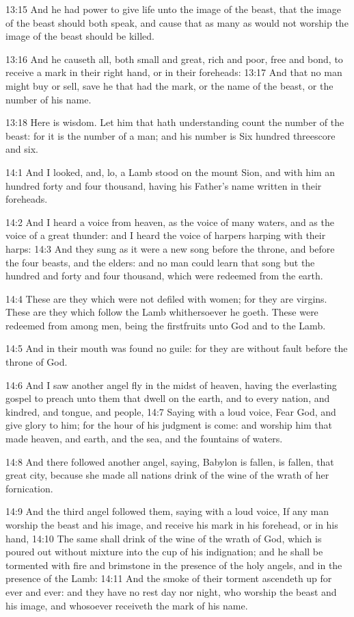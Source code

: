 13:15 And he had power to give life unto the image of the beast, that
the image of the beast should both speak, and cause that as many as
would not worship the image of the beast should be killed.

13:16 And he causeth all, both small and great, rich and poor, free
and bond, to receive a mark in their right hand, or in their
foreheads: 13:17 And that no man might buy or sell, save he that had
the mark, or the name of the beast, or the number of his name.

13:18 Here is wisdom. Let him that hath understanding count the number
of the beast: for it is the number of a man; and his number is Six
hundred threescore and six.

14:1 And I looked, and, lo, a Lamb stood on the mount Sion, and with
him an hundred forty and four thousand, having his Father's name
written in their foreheads.

14:2 And I heard a voice from heaven, as the voice of many waters, and
as the voice of a great thunder: and I heard the voice of harpers
harping with their harps: 14:3 And they sung as it were a new song
before the throne, and before the four beasts, and the elders: and no
man could learn that song but the hundred and forty and four thousand,
which were redeemed from the earth.

14:4 These are they which were not defiled with women; for they are
virgins. These are they which follow the Lamb whithersoever he goeth.
These were redeemed from among men, being the firstfruits unto God and
to the Lamb.

14:5 And in their mouth was found no guile: for they are without fault
before the throne of God.

14:6 And I saw another angel fly in the midst of heaven, having the
everlasting gospel to preach unto them that dwell on the earth, and to
every nation, and kindred, and tongue, and people, 14:7 Saying with a
loud voice, Fear God, and give glory to him; for the hour of his
judgment is come: and worship him that made heaven, and earth, and the
sea, and the fountains of waters.

14:8 And there followed another angel, saying, Babylon is fallen, is
fallen, that great city, because she made all nations drink of the
wine of the wrath of her fornication.

14:9 And the third angel followed them, saying with a loud voice, If
any man worship the beast and his image, and receive his mark in his
forehead, or in his hand, 14:10 The same shall drink of the wine of
the wrath of God, which is poured out without mixture into the cup of
his indignation; and he shall be tormented with fire and brimstone in
the presence of the holy angels, and in the presence of the Lamb:
14:11 And the smoke of their torment ascendeth up for ever and ever:
and they have no rest day nor night, who worship the beast and his
image, and whosoever receiveth the mark of his name.

